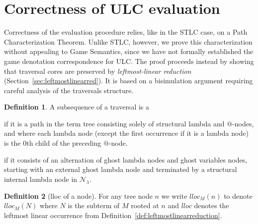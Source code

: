 \documentclass{elsarticle}
\makeatletter
\theoremstyle{plain}
\theoremstyle{definition}
\newtheorem{definition}{Definition}[section]
\newcommand\Nodes{\mathcal{N}}%
\newcommand\NodesLmd{\Nodes_\lambda}%
\renewcommand\ie{{\it i.e.\@\xspace}}
\makeatother
\begin{document}
\section{Correctness of ULC evaluation}
\label{sec:correctness_ulc_normalization}
Correctness of the evaluation procedure relies, like in the STLC case, on a Path Characterization Theorem.
Unlike STLC, however, we prove this characterization without appealing to Game Semantics, since we have not formally established the game denotation correspondence for ULC.
The proof proceeds instead by showing that traversal cores are preserved by \emph{leftmost-linear reduction} (Section~\ref{sec:leftmostlinearred}). It is based on a bisimulation argument requiring careful analysis of the traversals structure.


\begin{definition}
    \label{def:spinaldescent_pendingarglookup}
A subsequence of a traversal is a
\begin{enumerate*}[nosep,label=(\roman*)]
\item {} if it is a path in the term tree consisting solely of structural lambda and $@$-nodes, and where each lambda node (except the first occurrence if it is a lambda node) is the $0$th child of the preceding $@$-node.
\item {} if it consists of an alternation of ghost lambda nodes and ghost variables nodes, starting with an external ghost lambda node and terminated by a structural internal lambda node in $\NodesLmd$.
\end{enumerate*}
\end{definition}

\begin{definition}[lloc of a node]
For any tree node $n$ we write $lloc_M(n)$ to denote $lloc_M(N)$ where $N$ is the subterm of $M$ rooted at $n$ and $lloc$ denotes the leftmost linear occurrence from Definition~\ref{def:leftmostlinearreduction}.
\end{definition}
\end{document}
